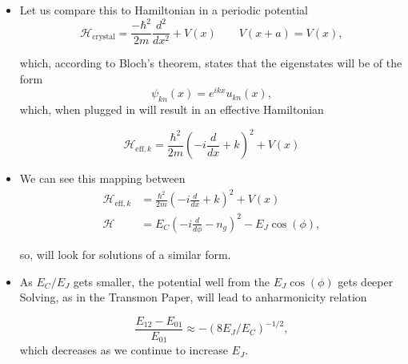 \begin{itemize}
\item Let us compare this to Hamiltonian in a periodic potential
  \begin{equation}\label{key}
    \mathcal{H}_\text{crystal} = \frac{-\hbar^2}{2m}\frac{d^2}{dx^2}+V(x)\qquad V(x+a) = V(x),
  \end{equation}

  \noindent which, according to Bloch's theorem, states that the eigenstates will be of the form
  \begin{equation}\label{key}
    \psi_{kn}(x) = e^{ikx}u_{kn}(x),
  \end{equation}
  \noindent which, when plugged in will result in an effective Hamiltonian

  \begin{equation}\label{key}
    \mathcal{H}_{\text{eff},k} = \frac{\hbar^2}{2m}\left(-i\frac{d}{dx}+k\right)^2 + V(x)
  \end{equation}
\item We can see this mapping between
  \begin{equation}\label{key}
    \begin{aligned}
      \mathcal{H}_{\text{eff},k} & = \frac{\hbar^2}{2m}\left(-i\frac{d}{dx}+k\right)^2 + V(x)\\
      \mathcal{H} & = E_C\left(-i\frac{d}{d\phi} - n_g\right)^2 - E_J\cos(\phi),
    \end{aligned}
  \end{equation}

  \noindent so, will look for solutions of a similar form.
\item As $ E_C/E_J  $ gets smaller, the potential well  from the $ E_J\cos(\phi) $ gets  deeper  Solving, as in  the Transmon Paper, will lead
  to anharmonicity relation

  \begin{framed}\noindent
    \begin{equation}\label{key} \frac{E_{12} - E_{01}}{E_{01}}\approx -(8E_J/E_C)^{-1/2},
    \end{equation}
    \noindent which decreases as we continue to increase $ E_J $.
  \end{framed}
\end{itemize}
\newpage
